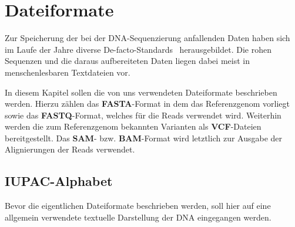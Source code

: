 \chapter{Dateiformate}
\label{sec:data}
Zur Speicherung der bei der DNA-Sequenzierung anfallenden Daten haben sich im Laufe der Jahre diverse De-facto-Standards~\citep{Cock2010} herausgebildet.
Die rohen Sequenzen und die daraus aufbereiteten Daten liegen dabei meist in menschenlesbaren Textdateien vor.

In diesem Kapitel sollen die von uns verwendeten Dateiformate beschrieben werden.
Hierzu zählen das \textbf{FASTA}-Format in dem das Referenzgenom vorliegt sowie das \textbf{FASTQ}-Format, welches für die Reads verwendet wird.
Weiterhin werden die zum Referenzgenom bekannten Varianten als \textbf{VCF}-Dateien bereitgestellt.
Das \textbf{SAM}- bzw. \textbf{BAM}-Format wird letztlich zur Ausgabe der Alignierungen der Reads verwendet.

\section{IUPAC-Alphabet}
\label{sec:data:iupac}
Bevor die eigentlichen Dateiformate beschrieben werden, soll hier auf eine allgemein verwendete textuelle Darstellung der DNA eingegangen werden.

